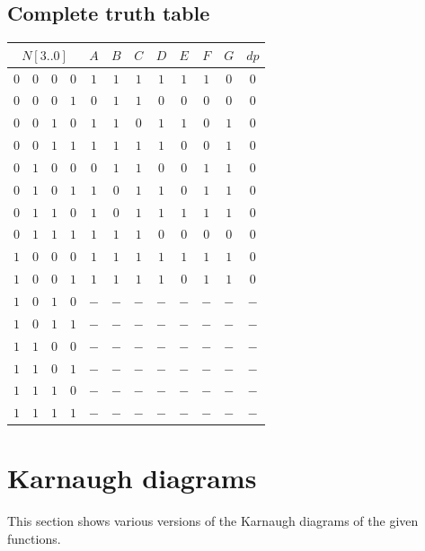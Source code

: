\documentclass [15pt,a4paper,twoside]{article}
\begin{document}
\subsection{Complete truth table}
\begin{center}
\begin{tabular}{cccc|cccccccc}
\multicolumn{4}{c|}{$N[3..0]$}&$A$&$B$&$C$&$D$&$E$&$F$&$G$&$dp$\\
\hline
$0$&$0$&$0$&$0$&$1$&$1$&$1$&$1$&$1$&$1$&$0$&$0$\\
$0$&$0$&$0$&$1$&$0$&$1$&$1$&$0$&$0$&$0$&$0$&$0$\\
$0$&$0$&$1$&$0$&$1$&$1$&$0$&$1$&$1$&$0$&$1$&$0$\\
$0$&$0$&$1$&$1$&$1$&$1$&$1$&$1$&$0$&$0$&$1$&$0$\\
$0$&$1$&$0$&$0$&$0$&$1$&$1$&$0$&$0$&$1$&$1$&$0$\\
$0$&$1$&$0$&$1$&$1$&$0$&$1$&$1$&$0$&$1$&$1$&$0$\\
$0$&$1$&$1$&$0$&$1$&$0$&$1$&$1$&$1$&$1$&$1$&$0$\\
$0$&$1$&$1$&$1$&$1$&$1$&$1$&$0$&$0$&$0$&$0$&$0$\\
$1$&$0$&$0$&$0$&$1$&$1$&$1$&$1$&$1$&$1$&$1$&$0$\\
$1$&$0$&$0$&$1$&$1$&$1$&$1$&$1$&$0$&$1$&$1$&$0$\\
$1$&$0$&$1$&$0$&$-$&$-$&$-$&$-$&$-$&$-$&$-$&$-$\\
$1$&$0$&$1$&$1$&$-$&$-$&$-$&$-$&$-$&$-$&$-$&$-$\\
$1$&$1$&$0$&$0$&$-$&$-$&$-$&$-$&$-$&$-$&$-$&$-$\\
$1$&$1$&$0$&$1$&$-$&$-$&$-$&$-$&$-$&$-$&$-$&$-$\\
$1$&$1$&$1$&$0$&$-$&$-$&$-$&$-$&$-$&$-$&$-$&$-$\\
$1$&$1$&$1$&$1$&$-$&$-$&$-$&$-$&$-$&$-$&$-$&$-$\\

\end{tabular}
\end{center}
\section{Karnaugh diagrams}
This section shows various versions of the Karnaugh diagrams of the given functions.
\end{document}
